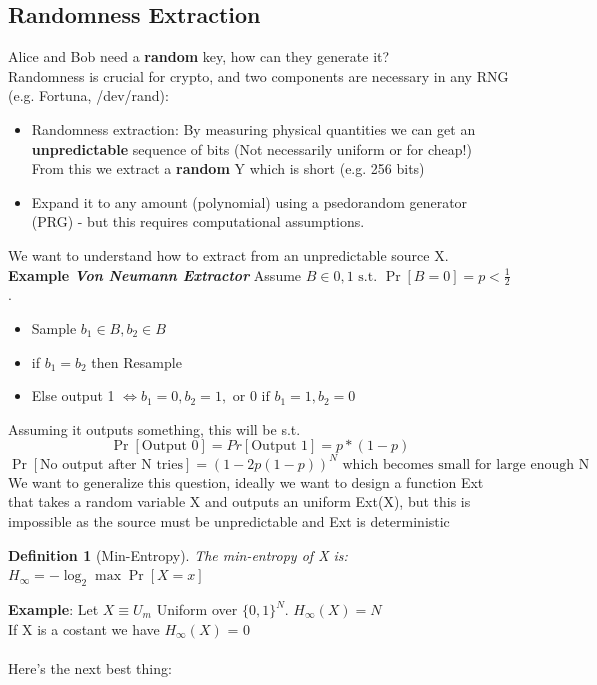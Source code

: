 \documentclass[11pt, a4paper]{article}
\newtheorem{defn}{Definition}
\begin{document}
\subsection{Randomness Extraction}
Alice and Bob need a \textbf{random} key, how can they generate it?\\
Randomness is crucial for crypto, and two components are necessary in any RNG (e.g. Fortuna, /dev/rand):\\
\begin{itemize}
    \item Randomness extraction: By measuring physical quantities we can get an \textbf{unpredictable} sequence of bits (Not necessarily uniform or for cheap!)\\ From this we extract a \textbf{random} Y which is short (e.g. 256 bits)
    \item Expand it to any amount (polynomial) using a psedorandom generator (PRG) - but this requires computational assumptions.
\end{itemize}
We want to understand how to extract from an unpredictable source X.\\
\textbf{Example \textit{Von Neumann Extractor}}
Assume $B \in {0,1} \text{ s.t. } \Pr[B=0] = p < \frac{1}{2}$.
\begin{itemize}
    \item Sample $b_1 \in B, b_2 \in B$
    \item if $b_1 = b_2$ then Resample
    \item Else output 1 $\iff b_1 = 0, b_2 = 1, \text{ or 0 if } b_1 = 1, b_2 =0$
\end{itemize}
Assuming it outputs something, this will be s.t.\\
$$\Pr[\text{Output 0}] = Pr[\text{Output 1}] = p*(1-p)$$
$$\Pr[\text{No output after N tries}] = (1-2p(1-p))^N \text{ which becomes small for large enough N}$$
We want to generalize this question, ideally we want to design a function Ext that takes a random variable X and outputs an uniform Ext(X), but this is impossible as the source must be unpredictable and Ext is deterministic
\begin{defn}[Min-Entropy]
    The min-entropy of X is: $H_{\infty} = - \log_2\max{\Pr[X=x]}$
\end{defn}
\textbf{Example}:
Let $X \equiv U_m$ Uniform over $\{0,1\}^{N}$. $ H_{\infty} (X) = N$\\
If X is a costant we have $H_\infty (X)$ = 0
\\\\
Here's the next best thing:\\
\end{document}
